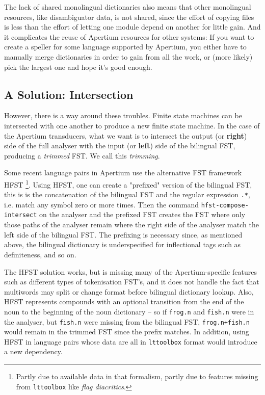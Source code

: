 \documentclass[10pt, a4paper]{article}
\newcommand{\ana}[1]{\texttt{#1}}
\newcommand{\tool}[1]{\texttt{#1}}
\begin{document}
The lack of shared monolingual dictionaries also means that other
monolingual resources, like disambiguator data, is not shared, since
the effort of copying files is less than the effort of letting one
module depend on another for little gain. And it complicates the reuse
of Apertium resources for other systems: If you want to create a speller
for some language supported by Apertium, you either have to manually
merge dictionaries in order to gain from all the work, or (more
likely) pick the largest one and hope it's good enough.

\subsection{A Solution: Intersection}
\label{sec:solution}

However, there is a way around these troubles. Finite state machines
can be intersected with one another to produce a new finite state
machine. In the case of the Apertium transducers, what we want is to
intersect the output (or \textbf{right}) side of the full analyser
with the input (or \textbf{left}) side of the bilingual FST, producing
a \emph{trimmed} FST. We call this \emph{trimming}.

Some recent language pairs in Apertium use the alternative FST
framework HFST \cite{linden2011hfst}\footnote{Partly due to available
data in that formalism, partly due to features missing from
\tool{lttoolbox} like \emph{flag diacritics}.}. Using HFST, one can
create a "prefixed" version of the bilingual FST, this is is the
concatenation of the bilingual FST and the regular expression
\texttt{.*}, i.e. match any symbol zero or more times. Then the command
\tool{hfst-compose-intersect} on the analyser and the prefixed FST
creates the FST where only those paths of the analyser remain where
the right side of the analyser match the left side of the bilingual
FST. The prefixing is necessary since, as mentioned above, the
bilingual dictionary is underspecified for inflectional tags such as
definiteness, and so on.

The HFST solution works, but is missing many of the Apertium-specific
features such as different types of tokenisation FST's, and it does
not handle the fact that multiwords may split or change format before
bilingual dictionary lookup. Also, HFST represents compounds with an
optional transition from the end of the noun to the beginning of the
noun dictionary -- so if \ana{frog.n} and \ana{fish.n} were in the
analyser, but \ana{fish.n} were missing from the bilingual FST,
\ana{frog.n+fish.n} would remain in the trimmed FST since the prefix
matches. In addition, using HFST in language pairs whose data are all
in \tool{lttoolbox} format would introduce a new dependency.
\end{document}
